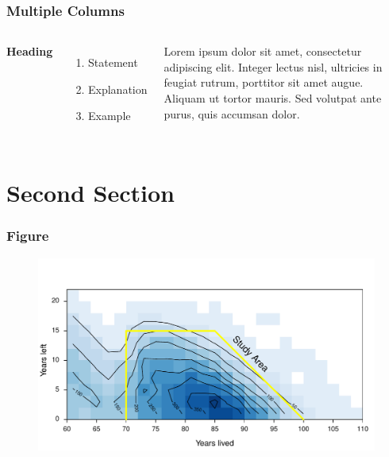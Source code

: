 \documentclass{beamer}
\begin{document}
\begin{frame}
\frametitle{Multiple Columns}
\begin{columns}[c] %

\textbf{Heading}
\begin{enumerate}
\item Statement
\item Explanation
\item Example
\end{enumerate}

Lorem ipsum dolor sit amet, consectetur adipiscing elit. Integer lectus nisl, ultricies in feugiat rutrum, porttitor sit amet augue. Aliquam ut tortor mauris. Sed volutpat ante purus, quis accumsan dolor.

\end{columns}
\end{frame}

\section{Second Section}





\begin{frame}
\frametitle{Figure}

\begin{figure}
\includegraphics[width=0.8\linewidth]{Figures/CaseCountFemales}
\end{figure}
\end{frame}







\end{document}
